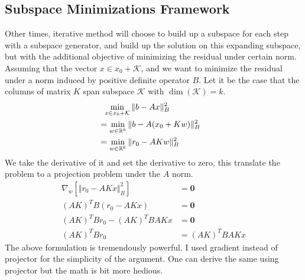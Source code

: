 \documentclass[]{article}
\theoremstyle{definition}
\begin{document}
    \subsection{Subspace Minimizations Framework}
        Other times, iterative method will choose to build up a subspace for each step with a subspace generator, and build up the solution on this expanding subspace, but with the additional objective of minimizing the residual under certain norm. Assuming that the vector $x\in x_0 + \mathcal{K}$, and we want to minimize the residual under a norm induced by positive definite operator $B$. Let it be the case that the columns of matrix $K$ span subspace $\mathcal{K}$ with $\dim(\mathcal K) = k$. 
        \begin{align}
            &\hspace{0.6em} \min_{x\in x_0 + \mathcal{K}} \Vert b - Ax\Vert_B^2 
            \\
            &= \min_{w\in \mathbb{R}^{k}} 
            \Vert b - A(x_0 + Kw)\Vert_B^2 & 
            \\
            &= \min_{w\in \mathbb{R}^{k}} 
            \Vert 
                r_0 - AKw
            \Vert_B^2
        \end{align}
        We take the derivative of it and set the derivative to zero, this translate the problem to a projection problem under the $A$ norm. 
        \begin{align}
            \nabla_w \left[
                \Vert r_0 - AKx\Vert_B^2
            \right] &= \mathbf{0}
            \\
            (AK)^TB(r_0 - AKx) &= \mathbf{0}
            \\
            (AK)^TBr_0 - (AK)^TBAKx &= \mathbf{0}
            \\
            (AK)^TBr_0 &= (AK)^TBAKx
        \end{align}
        The above formulation is tremendously powerful. I used gradient instead of projector for the simplicity of the argument. One can derive the same using projector but the math is bit more hedious. 
\end{document}
